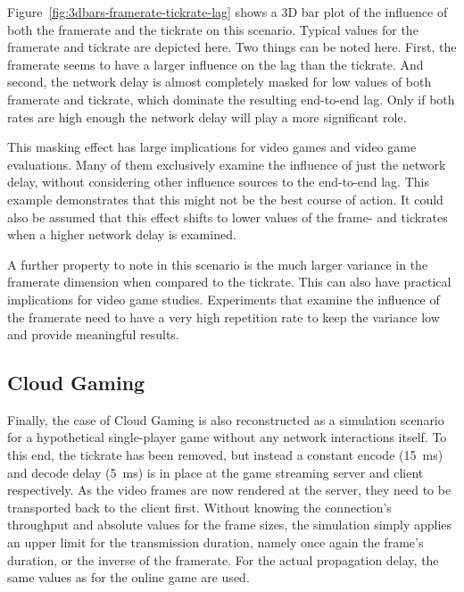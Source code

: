 Figure~\ref{fig:3dbars-framerate-tickrate-lag} shows a 3D bar plot of the influence of both the framerate and the tickrate on this scenario. Typical values for the framerate and tickrate are depicted here. Two things can be noted here. First, the framerate seems to have a larger influence on the lag than the tickrate. And second, the network delay is almost completely masked for low values of both framerate and tickrate, which dominate the resulting end-to-end lag. Only if both rates are high enough the network delay will play a more significant role.

This masking effect has large implications for video games and video game evaluations. Many of them exclusively examine the influence of just the network delay, without considering other influence sources to the end-to-end lag. This example demonstrates that this might not be the best course of action. It could also be assumed that this effect shifts to lower values of the frame- and tickrates when a higher network delay is examined.

A further property to note in this scenario is the much larger variance in the framerate dimension when compared to the tickrate. This can also have practical implications for video game studies. Experiments that examine the influence of the framerate need to have a very high repetition rate to keep the variance low and provide meaningful results.


\subsection{Cloud Gaming}

Finally, the case of Cloud Gaming is also reconstructed as a simulation scenario for a hypothetical single-player game without any network interactions itself. To this end, the tickrate has been removed, but instead a constant encode (\SI{15}{\milli\second}) and decode delay (\SI{5}{\milli\second}) is in place at the game streaming server and client respectively. As the video frames are now rendered at the server, they need to be transported back to the client first. 
Without knowing the connection's throughput and absolute values for the frame sizes, the simulation simply applies an upper limit for the transmission duration, namely once again the frame's duration, or the inverse of the framerate. For the actual propagation delay, the same values as for the online game are used.

